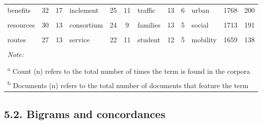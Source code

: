 \documentclass[]{elsarticle} %
\begin{document}
\begin{table}
{\begin{tabular}[t]{lcclcclcclcc}
benefits & 32 & 17 & inclement & 25 & 11 & traffic & 13 & 6 & urban & 1768 & 200\\
\addlinespace
\cellcolor{gray!6}{play} & \cellcolor{gray!6}{31} & \cellcolor{gray!6}{2} & \cellcolor{gray!6}{eligibility} & \cellcolor{gray!6}{24} & \cellcolor{gray!6}{11} & \cellcolor{gray!6}{support} & \cellcolor{gray!6}{13} & \cellcolor{gray!6}{6} & \cellcolor{gray!6}{home} & \cellcolor{gray!6}{1715} & \cellcolor{gray!6}{199}\\
resources & 30 & 13 & consortium & 24 & 9 & families & 13 & 5 & social & 1713 & 191\\
\cellcolor{gray!6}{healthy} & \cellcolor{gray!6}{29} & \cellcolor{gray!6}{16} & \cellcolor{gray!6}{region} & \cellcolor{gray!6}{23} & \cellcolor{gray!6}{10} & \cellcolor{gray!6}{way} & \cellcolor{gray!6}{12} & \cellcolor{gray!6}{5} & \cellcolor{gray!6}{different} & \cellcolor{gray!6}{1713} & \cellcolor{gray!6}{215}\\
routes & 27 & 13 & service & 22 & 11 & student & 12 & 5 & mobility & 1659 & 138\\
\cellcolor{gray!6}{lanes} & \cellcolor{gray!6}{26} & \cellcolor{gray!6}{3} & \cellcolor{gray!6}{•} & \cellcolor{gray!6}{21} & \cellcolor{gray!6}{1} & \cellcolor{gray!6}{region} & \cellcolor{gray!6}{12} & \cellcolor{gray!6}{4} & \cellcolor{gray!6}{significant} & \cellcolor{gray!6}{1650} & \cellcolor{gray!6}{208}\\
\bottomrule
\multicolumn{12}{l}{\rule{0pt}{1em}\textit{Note: }}\\
\multicolumn{12}{l}{\rule{0pt}{1em} }\\
\multicolumn{12}{l}{\rule{0pt}{1em}\textsuperscript{a} Count (n) refers to the total number of times the term is found in the corpora}\\
\multicolumn{12}{l}{\rule{0pt}{1em}\textsuperscript{b} Documents (n) refers to the total number of documents that feature the term}\\
\end{tabular}}
\end{table}

\hypertarget{bigrams-and-concordances}{%
\subsection{5.2. Bigrams and
concordances}\label{bigrams-and-concordances}}
\end{document}
